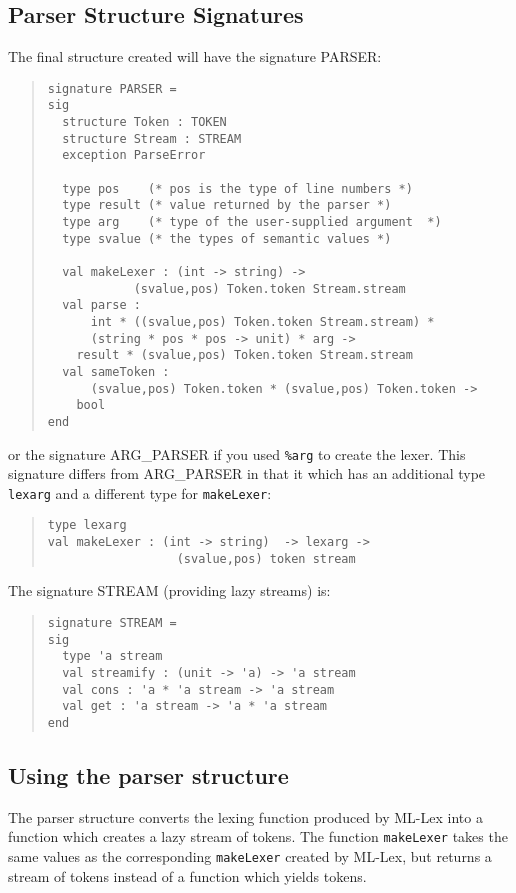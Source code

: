 \subsection{Parser Structure Signatures}
The final structure created will have the signature PARSER:
\begin{quote}
\begin{verbatim}
signature PARSER =
sig
  structure Token : TOKEN
  structure Stream : STREAM
  exception ParseError

  type pos    (* pos is the type of line numbers *)
  type result (* value returned by the parser *)
  type arg    (* type of the user-supplied argument  *)
  type svalue (* the types of semantic values *)

  val makeLexer : (int -> string) ->
		    (svalue,pos) Token.token Stream.stream
  val parse :
      int * ((svalue,pos) Token.token Stream.stream) *
      (string * pos * pos -> unit) * arg ->
	result * (svalue,pos) Token.token Stream.stream
  val sameToken :
      (svalue,pos) Token.token * (svalue,pos) Token.token ->
	bool
end
\end{verbatim}
\end{quote}
or the signature ARG\_PARSER if you used {\tt \%arg} to create the lexer.
This signature differs from ARG\_PARSER in that it
which has an additional type {\tt lexarg} and a different type
for {\tt makeLexer}:
\begin{quote}
\begin{verbatim}
type lexarg
val makeLexer : (int -> string)  -> lexarg ->
                  (svalue,pos) token stream
\end{verbatim}
\end{quote}

The signature STREAM (providing lazy streams) is:
\begin{quote}
\begin{verbatim}
signature STREAM =
sig
  type 'a stream
  val streamify : (unit -> 'a) -> 'a stream
  val cons : 'a * 'a stream -> 'a stream
  val get : 'a stream -> 'a * 'a stream
end
\end{verbatim}
\end{quote}

\subsection{Using the parser structure}

The parser structure converts the lexing function produced by
ML-Lex into a function which creates a lazy stream of tokens.  The
function {\tt makeLexer} takes the same values as the corresponding
{\tt makeLexer} created by ML-Lex, but returns a stream of tokens
instead of a function which yields tokens.

